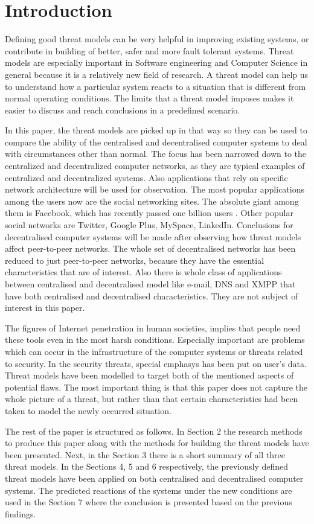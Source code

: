 \newpage
\section{Introduction}
Defining good threat models can be very helpful in improving existing systems, or contribute in building of better, safer and more fault tolerant systems.
Threat models are especially important in Software engineering and Computer Science in general because it is a relatively new field of research.
A threat model can help us to understand how a particular system reacts to a situation that is different from normal operating conditions.
The limits that a threat model imposes makes it easier to discuss and reach conclusions in a predefined scenario.

In this paper, the threat models are picked up in that way so they can be used to compare the ability of the centralised and decentralised computer systems to deal with circumstances other than normal.
The focus has been narrowed down to the centralized and decentralized computer networks, as they are typical examples of centralized and decentralized systems. Also applications that rely on specific network architecture will be used for observation.
The most popular applications among the users now are the social networking sites. The absolute giant among them is Facebook, which has recently passed one billion users \cite{web:facebookpassesbillion}. Other popular social networks are Twitter, Google Plus, MySpace, LinkedIn.
Conclusions for decentralised computer systems will be made after observing how threat models affect peer-to-peer networks.
The whole set of decentralised networks has been reduced to just peer-to-peer networks, because they have the essential characteristics that are of interest.
Also there is whole class of applications between centralised and decentralised model like e-mail, DNS and XMPP that have both centralised and decentralised characteristics.
They are not subject of interest in this paper.

The figures of Internet penetration \cite{web:internetworldstats} in human societies, implies that people need these tools even in the most harsh conditions.
Especially important are problems which can occur in the infrastructure of the computer systems or threats related to security.
In the security threats, special emphasys has been put on user's data.
Threat models have been modelled to target both of the mentioned aspects of potential flaws.
The most important thing is that this paper does not capture the whole picture of a threat, but rather than that certain characteristics had been taken to model the newly occurred situation.

The rest of the paper is structured as follows.
In Section 2 the research methods to produce this paper along with the methods for building the threat models have been presented.
Next, in the Section 3 there is a short summary of all three threat models.
In the Sections 4, 5 and 6 respectively, the previously defined threat models have been applied on both centralised and decentralised computer systems.
The predicted reactions of the systems under the new conditions are used in the Section 7 where the conclusion is presented based on the previous findings.
